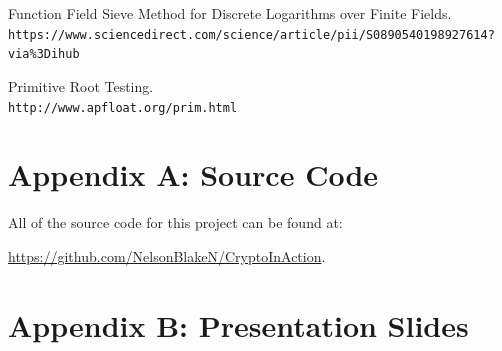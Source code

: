 \documentclass[12pt]{report}
\begin{document}
\begin{thebibliography}{9}
    Function Field Sieve Method for Discrete Logarithms over Finite Fields.\\
    \texttt{https://www.sciencedirect.com/science/article/pii/S0890540198927614?via\%3Dihub}

    Primitive Root Testing.\\
    \texttt{http://www.apfloat.org/prim.html}

\end{thebibliography}

\newpage
\section{Appendix A: Source Code}
All of the source code for this project can be found at:

\href{https://github.com/NelsonBlakeN/CryptoInAction}{https://github.com/NelsonBlakeN/CryptoInAction}.

\newpage
\section{Appendix B: Presentation Slides}
\end{document}

